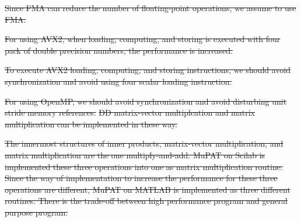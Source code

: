 \documentclass{IOS-Book-Article}
\begin{document}
\sout{Since FMA can reduce the number of floating-point operations, we assume to use FMA.  }
{}

\sout{For using AVX2, when loading, computing, and storing is executed with four pack of double precision numbers, the performance is increased. }

\sout{To execute AVX2 loading, computing, and storing instructions, we should avoid synchronization and avoid using four scalar loading instruction.}
{} 

\sout{For using OpenMP, we should avoid synchronization and avoid disturbing unit stride memory references.}
{}
\sout{DD matrix-vector multiplcation and matrix multiplication can be implemented in these way. }


\sout{The innermost structures of inner products, matrix-vector multiplication, and matrix multiplication are the one multiply-and-add. MuPAT on Scilab is implemented these three operations into one as matrix multiplication routine. Since the way of implementation to increase the performance for these three operations are different, MuPAT on MATLAB is implemented as three different routines. There is the trade-off between high performance program and general purpose program.}

{}
\end{document}
